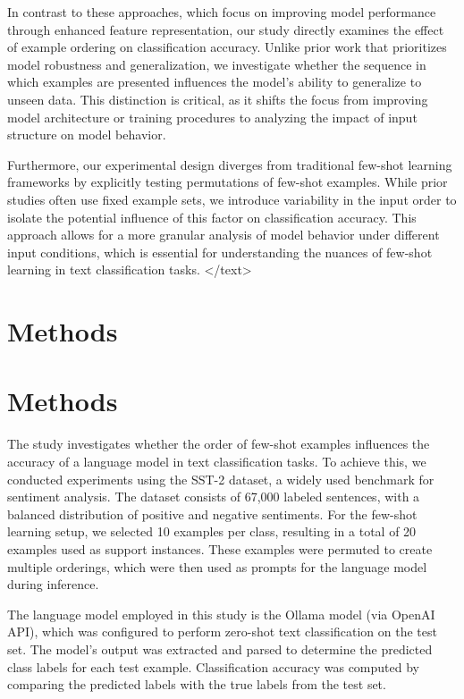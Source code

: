 \documentclass{article}
\begin{document}
In contrast to these approaches, which focus on improving model performance through enhanced feature representation, our study directly examines the effect of example ordering on classification accuracy. Unlike prior work that prioritizes model robustness and generalization, we investigate whether the sequence in which examples are presented influences the model's ability to generalize to unseen data. This distinction is critical, as it shifts the focus from improving model architecture or training procedures to analyzing the impact of input structure on model behavior.

Furthermore, our experimental design diverges from traditional few-shot learning frameworks by explicitly testing permutations of few-shot examples. While prior studies often use fixed example sets, we introduce variability in the input order to isolate the potential influence of this factor on classification accuracy. This approach allows for a more granular analysis of model behavior under different input conditions, which is essential for understanding the nuances of few-shot learning in text classification tasks.
</text>
\section{Methods}
\section*{Methods}

The study investigates whether the order of few-shot examples influences the accuracy of a language model in text classification tasks. To achieve this, we conducted experiments using the SST-2 dataset, a widely used benchmark for sentiment analysis. The dataset consists of 67,000 labeled sentences, with a balanced distribution of positive and negative sentiments. For the few-shot learning setup, we selected 10 examples per class, resulting in a total of 20 examples used as support instances. These examples were permuted to create multiple orderings, which were then used as prompts for the language model during inference.

The language model employed in this study is the Ollama model (via OpenAI API), which was configured to perform zero-shot text classification on the test set. The model's output was extracted and parsed to determine the predicted class labels for each test example. Classification accuracy was computed by comparing the predicted labels with the true labels from the test set.
\end{document}
